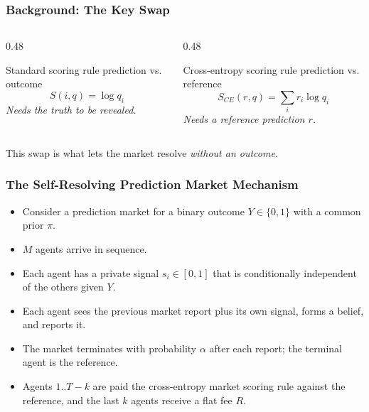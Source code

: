 \documentclass[
	11pt, %
]{beamer}
\begin{document}
\begin{frame}
	\frametitle{Background: The Key Swap}

	\begin{columns}[t]
		\begin{column}{0.48\textwidth}
			\begin{block}{Standard scoring rule}
				\centering
				prediction \quad vs. \quad \alert{outcome}
				\vspace{0.5em}
				$$ S(i, q) = \log q_i $$
				\vspace{0.3em}
				\emph{Needs the truth to be revealed.}
			\end{block}
		\end{column}
		\begin{column}{0.48\textwidth}
			\begin{block}{Cross-entropy scoring rule}
				\centering
				prediction \quad vs. \quad \alert{reference}
				\vspace{0.5em}
				$$ S_{CE}(r, q) = \sum_i r_i \log q_i $$
				\vspace{0.3em}
				\emph{Needs a reference prediction $r$.}
			\end{block}
		\end{column}
	\end{columns}

	\vspace{1em}
	\centering
	\small This swap is what lets the market resolve \emph{without an outcome}.
\end{frame}


\begin{frame}
	\frametitle{The Self-Resolving Prediction Market Mechanism}
	
	\begin{itemize}
		\item Consider a prediction market for a binary outcome $Y \in \{0,1\}$ with a common prior $\pi$.
		\item $M$ agents arrive in sequence.
		\item Each agent has a private signal $s_i \in [0,1]$ that is conditionally independent of the others given $Y$.
		\item Each agent sees the previous market report plus its own signal, forms a belief, and reports it.
		\item The market terminates with probability $\alpha$ after each report; the terminal agent is the reference.
		\item Agents $1..T-k$ are paid the cross-entropy market scoring rule against the reference, and the last $k$ agents receive a flat fee $R$.
	\end{itemize}
\end{frame}
\end{document}
